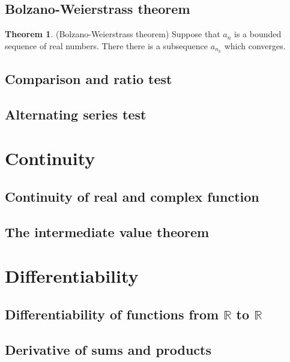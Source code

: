 \documentclass[12pt]{book}
\newcommand{\RR}{\mathbb R}
\theoremstyle{definition}
\newtheorem{theorem}{Theorem}[chapter]
\theoremstyle{remark}
\begin{document}
			\subsection{Bolzano-Weierstrass theorem}
				\begin{theorem}(Bolzano-Weierstrass theorem)
					Suppose that $a_n$ is a bounded sequence of real numbers. There there is a subsequence $a_{n_k}$ which converges.
				\end{theorem}
			\subsection{Comparison and ratio test}
			
			\subsection{Alternating series test}

		\section{Continuity}
			\subsection{Continuity of real and complex function}
			
			\subsection{The intermediate value theorem}
			
		\section{Differentiability}
			\subsection{Differentiability of functions from $\RR$ to $\RR$}
			
			\subsection{Derivative of sums and products}
			
\end{document}
